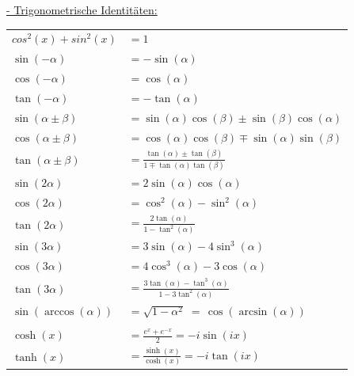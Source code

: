 \documentclass[6pt]{article}
\begin{document}
\begin{multicols*}{2}
\vspace{2mm}
\underline{- Trigonometrische Identit{\"a}ten:} \vspace{2mm} \\
\vspace{-7mm}	
\begin{multicols}{2}
	\renewcommand\arraystretch{1.3}
	\hspace{-15pt}
	\begin{tabular}{l l}
		$cos^2(x) + sin^2(x) $ & $= 1$ \\
		$ \sin(-\alpha) $  &  $ = -\sin(\alpha) $ \\
		$ \cos(-\alpha) $  &  $ = \cos(\alpha) $ \\
		$ \tan(-\alpha) $  &  $ = -\tan(\alpha) $ \\
		$ \sin(\alpha \pm \beta) $  &  $ = \scriptstyle \sin(\alpha)\cos(\beta) \pm \sin(\beta)\cos(\alpha) $ \\
		$ \cos(\alpha \pm \beta) $  &  $ = \scriptstyle \cos(\alpha)\cos(\beta) \mp \sin(\alpha)\sin(\beta) $ \\
		$ \tan(\alpha \pm \beta) $  &  $ = \frac{\tan(\alpha) \pm \tan(\beta)}{1 \mp \tan(\alpha)\tan(\beta)} $ \\
		$ \sin(2\alpha) $  &  $ = 2 \sin(\alpha)\cos(\alpha) $ \\
		$ \cos(2\alpha) $  &  $ = \cos^2(\alpha) - \sin^2(\alpha) $ \\
		$ \tan(2\alpha) $  &  $ = \frac{2 \tan(\alpha)}{1-\tan^2(\alpha)} $ \\
		$ \sin(3\alpha) $  &  $ = 3\sin(\alpha)-4 \sin^3(\alpha) $ \\
		$ \cos(3\alpha) $  &  $ = 4\cos^3(\alpha) - 3 \cos(\alpha) $ \\
		$ \tan(3\alpha) $  &  $ = \frac{3 \tan(\alpha) - \tan^3(\alpha)}{1-3\tan^2(\alpha)} $ \\
		
		$ \sin(\arccos(\alpha)) $  &  $ =  \sqrt{1-\alpha^2} \; \scriptstyle = \, \cos(\arcsin(\alpha)) $ \\
		\\
		$ \cosh(x) $ &$= \frac{e^x+e^{-x}}{2} = -i \sin(ix) $ \\
		$ \tanh(x) $ & $= \frac{\sinh(x)}{\cosh(x)} = -i\tan(ix) $ \\

	\end{tabular}
	

\end{multicols}
\end{multicols*}
\end{document}
